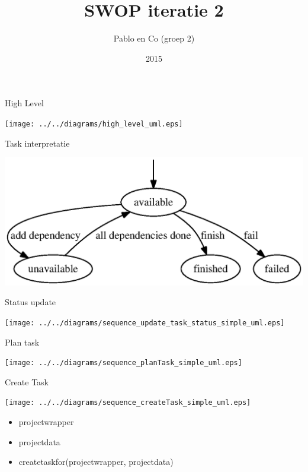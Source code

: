 \documentclass[mathserif,serif]{beamer}
\title{SWOP iteratie 2}
\author{Pablo en Co (groep 2)}
\institute{KU Leuven}
\date{2015}
\begin{document}
  \frame{\titlepage}

  \begin{frame}{High Level}
    \begin{center}
        \texttt{[image: ../../diagrams/high\_level\_uml.eps]}
    \end{center}
  \end{frame}

  \begin{frame}{Task interpretatie}
      \begin{center}
      \includegraphics[width=\textwidth,height=0.8\textheight,keepaspectratio]{../../diagrams/task_dfs.eps}
      \end{center}
  \end{frame}

  \begin{frame}{Status update}
      \begin{center}
      \texttt{[image: ../../diagrams/sequence\_update\_task\_status\_simple\_uml.eps]}
      \end{center}
  \end{frame}

  \begin{frame}{Plan task}
      \begin{center}
      \texttt{[image: ../../diagrams/sequence\_planTask\_simple\_uml.eps]}
      \end{center}
  \end{frame}
  
  \begin{frame}{Create Task}
      \begin{center}
      \texttt{[image: ../../diagrams/sequence\_createTask\_simple\_uml.eps]}
        \begin{itemize}
        \item projectwrapper
        \item projectdata
        \item createtaskfor(projectwrapper, projectdata)
        \end{itemize}
      \end{center}
  \end{frame}
\end{document}
